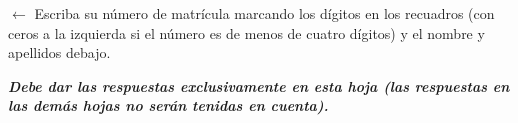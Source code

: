 \documentclass[a4paper]{article}
\def\AMCcleardoublepage{\ifodd\thepage\clearpage\mbox{}\fi\clearpage}
\begin{document}
{\noindent{}\hspace*{\fill}
\begin{minipage}{.7\linewidth}
$\longleftarrow{}$ Escriba su número de matrícula marcando los dígitos
en los recuadros (con ceros a la izquierda si el número es de menos de cuatro dígitos) y el nombre y apellidos debajo.

\vspace{3ex}

\end{minipage}

\begin{center}
 \bf\em Debe dar las respuestas exclusivamente en esta hoja (las respuestas en las demás hojas no serán tenidas en cuenta).
\end{center}



\AMCform
\AMCcleardoublepage
}
\end{document}
